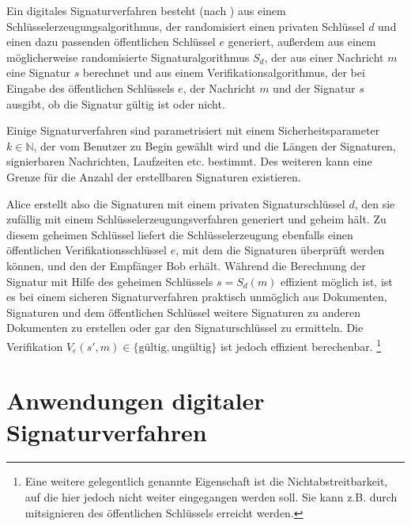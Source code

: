 \documentclass[a4paper,12pt,oneside]{scrreprt}
\begin{document}
Ein digitales Signaturverfahren besteht (nach \cite{Itkis04forwardsecurity, Goldwasser95adigital}) aus einem Schlüsselerzeugungsalgorithmus, der randomisiert einen privaten Schlüssel $d$ und einen dazu passenden öffentlichen Schlüssel $e$ generiert, außerdem aus einem möglicherweise randomisierte Signaturalgorithmus $S_d$, der aus einer Nachricht $m$ eine Signatur $s$ berechnet und aus einem Verifikationsalgorithmus, der bei Eingabe des öffentlichen Schlüssels $e$, der Nachricht $m$ und der Signatur $s$ ausgibt, ob die Signatur gültig ist oder nicht. 

Einige Signaturverfahren sind parametrisiert mit einem Sicherheitsparameter $k \in \mathbb{N}$, der vom Benutzer zu Begin gewählt wird und die Längen der Signaturen, signierbaren Nachrichten, Laufzeiten etc. bestimmt. Des weiteren kann eine Grenze für die Anzahl der erstellbaren Signaturen existieren. 

Alice erstellt also die Signaturen mit einem privaten Signaturschlüssel $d$, den sie zufällig mit einem Schlüsselerzeugungsverfahren generiert und geheim hält. Zu diesem geheimen Schlüssel liefert die Schlüsselerzeugung ebenfalls einen öffentlichen Verifikationsschlüssel $e$, mit dem die Signaturen überprüft werden können, und den der Empfänger Bob erhält. Während die Berechnung der Signatur mit Hilfe des geheimen Schlüssels $s = S_d(m)$ effizient möglich ist, ist es bei einem sicheren Signaturverfahren praktisch unmöglich aus Dokumenten, Signaturen und dem öffentlichen Schlüssel weitere Signaturen zu anderen Dokumenten zu erstellen oder gar den Signaturschlüssel zu ermitteln. Die Verifikation $V_e(s', m) \in \{\text{gültig}, \text{ungültig}\}$ ist jedoch effizient berechenbar. \footnote{Eine weitere gelegentlich genannte Eigenschaft ist die Nichtabstreitbarkeit, auf die hier jedoch nicht weiter eingegangen werden soll. Sie kann z.B. durch mitsignieren des öffentlichen Schlüssels erreicht werden. }

\section{Anwendungen digitaler Signaturverfahren}
\end{document}
